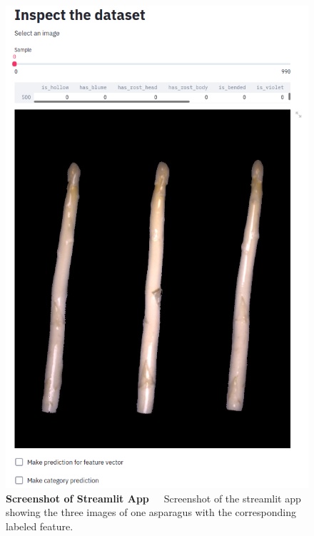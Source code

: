 \begin{figure}[!htb]
	\centering
	\includegraphics[scale=0.4]{Figures/chapter04/ftl_streamlit_app.png}
	\decoRule
	\caption[Screenshot of Streamlit App]{\textbf{Screenshot of Streamlit App}~~~Screenshot of the streamlit app showing the three images of one asparagus with the corresponding labeled feature.}
    \label{fig:FeaturetoLabelStreamlitApp}
\end{figure}    

